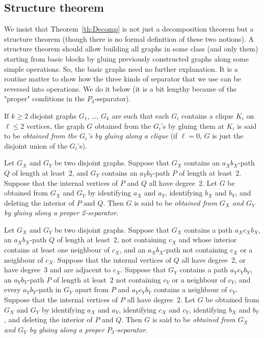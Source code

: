 \documentclass[11pt]{article}
\begin{document}
\subsection{Structure theorem}
\label{ssec:struct}

We insist that Theorem~\ref{th:Decomp} is not just a decomposition theorem but a structure theorem (though there is no formal definition of these two notions).  
A structure theorem should allow building all graphs in some class (and only them) starting from basic blocks by gluing previously constructed graphs along some simple operations. 
So, the basic graphs need no further explanation. 
It is a routine matter to show how the three kinds of separator that we use can be reversed into operations.  We do it below (it is a bit lengthy because of the "proper" conditions in the $P_3$-separator).

If $k\geq 2$ disjoint graphs $G_1$, \dots, $G_k$  are such that each $G_i$ contains a clique $K_i$ on $\ell \leq 2$ vertices, the graph $G$ obtained from the $G_i$'s by gluing them at $K_i$ is said to be \emph{obtained from the $G_i$'s by gluing along a clique} (if $\ell=0$, $G$ is just the disjoint union of the $G_i$'s). 

Let $G_X$ and $G_Y$ be two disjoint graphs. Suppose that $G_X$ contains an $a_Xb_X$-path $Q$ of length at least~2, and $G_Y$ contains an  $a_Yb_Y$-path $P$ of length at least~2.  
Suppose that the internal vertices of $P$ and $Q$ all have degree~2. Let $G$ be obtained from $G_X$ and $G_Y$ by identifying $a_X$ and $a_Y$, identifying $b_X$ and $b_Y$, and deleting the interior of $P$ and $Q$.  
Then $G$ is said to be \emph{obtained from $G_X$ and $G_Y$ by gluing along a proper 2-separator}. 

Let $G_X$ and $G_Y$ be two disjoint graphs. Suppose that $G_X$ contains a path $a_Xc_Xb_X$, an  $a_Xb_X$-path $Q$ of length at least~2, not containing $c_X$ and whose interior contains at least one neighbour of $c_X$, and an $a_Xb_X$-path not containing $c_X$ or a neighbour of $c_X$.  
Suppose that the internal vertices of  $Q$ all have degree~2, or have degree~3 and are adjacent to $c_X$.  
Suppose that $G_Y$ contains a path $a_Yc_Yb_Y$, an  $a_Yb_Y$-path $P$ of length at least~2 not containing $c_Y$ or a neighbour of $c_Y$, and every $a_Yb_Y$-path in $G_Y$ apart from $P$ and $a_Yc_Yb_Y$  contains a neighbour of $c_Y$.  
Suppose that the internal vertices of $P$ all have degree~2.  
Let $G$ be obtained from $G_X$ and $G_Y$ by identifying $a_X$ and $a_Y$, identifying $c_X$ and $c_Y$,  identifying $b_X$ and $b_Y$, and deleting the interior of $P$ and $Q$.  
Then $G$ is said to be \emph{obtained from $G_X$ and $G_Y$ by gluing along a proper $P_3$-separator}. 
\end{document}
